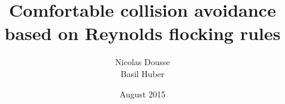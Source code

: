 \documentclass[a4paper, twocolumn]{article}
\begin{document}
\title{Comfortable collision avoidance based on Reynolds flocking rules}
\author{Nicolas Dousse\\Basil Huber }
\date{August 2015}


\twocolumn[
	\maketitle
	\begin{abstract}
	
	\vspace{10pt}
	\end{abstract}
]












\printbibliography[title=References]
\end{document}
